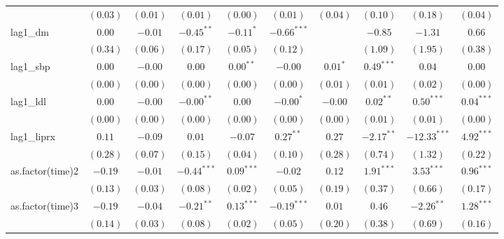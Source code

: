 \begin{tabular}{l c c c c c c c c c}
                 & $(0.03)$      & $(0.01)$      & $(0.01)$      & $(0.00)$      & $(0.01)$      & $(0.04)$       & $(0.10)$      & $(0.18)$       & $(0.04)$       \\
lag1\_dm         & $0.00$        & $-0.01$       & $-0.45^{**}$  & $-0.11^{*}$   & $-0.66^{***}$ &                & $-0.85$       & $-1.31$        & $0.66$         \\
                 & $(0.34)$      & $(0.06)$      & $(0.17)$      & $(0.05)$      & $(0.12)$      &                & $(1.09)$      & $(1.95)$       & $(0.38)$       \\
lag1\_sbp        & $0.00$        & $-0.00$       & $0.00$        & $0.00^{**}$   & $-0.00$       & $0.01^{*}$     & $0.49^{***}$  & $0.04$         & $0.00$         \\
                 & $(0.00)$      & $(0.00)$      & $(0.00)$      & $(0.00)$      & $(0.00)$      & $(0.01)$       & $(0.01)$      & $(0.02)$       & $(0.00)$       \\
lag1\_ldl        & $0.00$        & $-0.00$       & $-0.00^{**}$  & $0.00$        & $-0.00^{*}$   & $-0.00$        & $0.02^{**}$   & $0.50^{***}$   & $0.04^{***}$   \\
                 & $(0.00)$      & $(0.00)$      & $(0.00)$      & $(0.00)$      & $(0.00)$      & $(0.00)$       & $(0.01)$      & $(0.01)$       & $(0.00)$       \\
lag1\_liprx      & $0.11$        & $-0.09$       & $0.01$        & $-0.07$       & $0.27^{**}$   & $0.27$         & $-2.17^{**}$  & $-12.33^{***}$ & $4.92^{***}$   \\
                 & $(0.28)$      & $(0.07)$      & $(0.15)$      & $(0.04)$      & $(0.10)$      & $(0.28)$       & $(0.74)$      & $(1.32)$       & $(0.22)$       \\
as.factor(time)2 & $-0.19$       & $-0.01$       & $-0.44^{***}$ & $0.09^{***}$  & $-0.02$       & $0.12$         & $1.91^{***}$  & $3.53^{***}$   & $0.96^{***}$   \\
                 & $(0.13)$      & $(0.03)$      & $(0.08)$      & $(0.02)$      & $(0.05)$      & $(0.19)$       & $(0.37)$      & $(0.66)$       & $(0.17)$       \\
as.factor(time)3 & $-0.19$       & $-0.04$       & $-0.21^{**}$  & $0.13^{***}$  & $-0.19^{***}$ & $0.01$         & $0.46$        & $-2.26^{**}$   & $1.28^{***}$   \\
                 & $(0.14)$      & $(0.03)$      & $(0.08)$      & $(0.02)$      & $(0.05)$      & $(0.20)$       & $(0.38)$      & $(0.69)$       & $(0.16)$       \\

\end{tabular}
